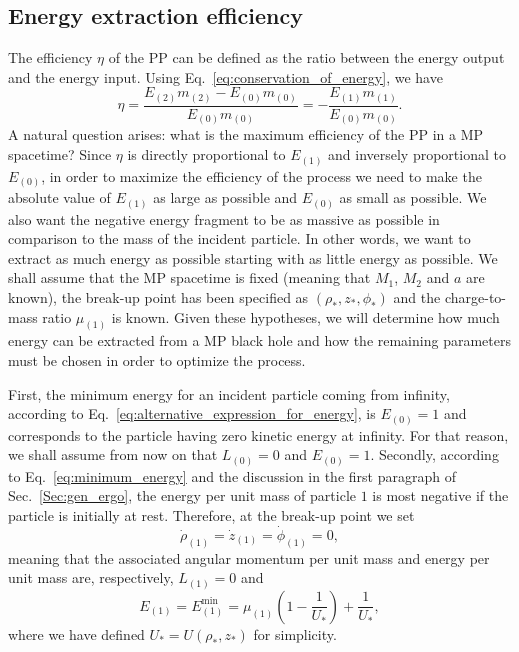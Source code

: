 \subsection{Energy extraction efficiency}

The efficiency $\eta$ of the \ac{PP} can be defined as the ratio between the energy output and the energy input. Using Eq.~\eqref{eq:conservation_of_energy}, we have
\begin{equation}
  \eta = \frac{E_{(2)}m_{(2)} - E_{(0)}m_{(0)}}{E_{(0)}m_{(0)}} = - \frac{E_{(1)}m_{(1)}}{E_{(0)}m_{(0)}}.
  \label{eq:penrose_efficiency_general}
\end{equation}
%
A natural question arises: what is the maximum efficiency of the \ac{PP} in a \ac{MP} spacetime? Since $\eta$ is directly proportional to $E_{(1)}$ and inversely proportional to $E_{(0)}$, in order to maximize the efficiency of the process we need to make the absolute value of $E_{(1)}$ as large as possible and $E_{(0)}$ as small as possible. We also want the negative energy fragment to be as massive as possible in comparison to the mass of the incident particle. In other words, we want to extract as much energy as possible starting with as little energy as possible. We shall assume that the \ac{MP} spacetime is fixed (meaning that $M_1$, $M_2$ and $a$ are known), the break-up point has been specified as $(\rho_*, z_*, \phi_*)$ and the charge-to-mass ratio $\mu_{(1)}$ is known. Given these hypotheses, we will determine how much energy can be extracted from a \ac{MP} black hole and how the remaining parameters must be chosen in order to optimize the process.

First, the minimum energy for an incident particle coming from infinity, according to Eq.~\eqref{eq:alternative_expression_for_energy}, is $E_{(0)}=1$ and corresponds to the particle having zero kinetic energy at infinity. For that reason, we shall assume from now on that $L_{(0)}=0$ and $E_{(0)}=1$. Secondly, according to Eq.~\eqref{eq:minimum_energy} and the discussion in the first paragraph of Sec.~\ref{Sec:gen_ergo}, the energy per unit mass of particle $1$ is most negative if the particle is initially at rest. Therefore, at the break-up point we set
\begin{equation} \label{eq:traj1}
  \dot{\rho}_{(1)}=\dot{z}_{(1)}=\dot{\phi}_{(1)}=0,
\end{equation}
meaning that the associated angular momentum per unit mass and energy per unit mass are, respectively, $L_{(1)}=0$ and
\begin{equation} \label{eq:penrose_neg_energy}
  E_{(1)}=E_{(1)}^{\mathrm {min}}=\mu_{(1)}\left(1 - \frac{1}{U_*} \right) + \frac{1}{U_*},
\end{equation}
where we have defined $U_*=U(\rho_*,z_*)$ for simplicity.

